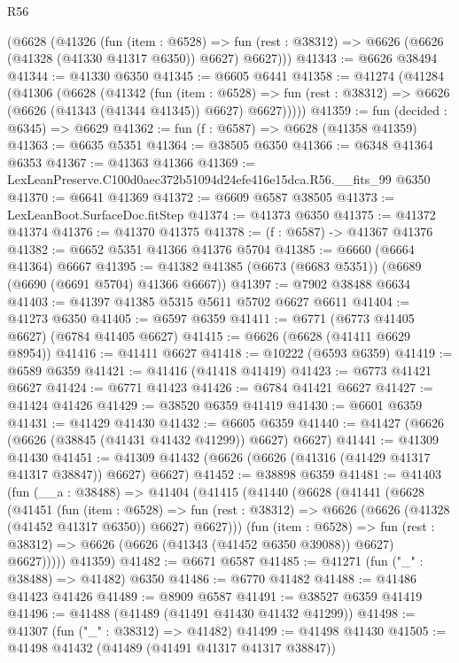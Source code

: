 \begin{lexlean}{R56}
\begin{coremodule}
    (@6628
      (@41326
        (fun (item : @6528) =>
        fun (rest : @38312) => @6626 (@6626 (@41328 (@41330 @41317 @6350)) @6627) @6627)))
@41343 := @6626 @38494
@41344 := @41330 @6350
@41345 := @6605 @6441
@41358 := @41274
    (@41284
      (@41306
        (@6628
          (@41342
            (fun (item : @6528) =>
            fun (rest : @38312) => @6626 (@6626 (@41343 (@41344 @41345)) @6627) @6627)))))
@41359 := fun (decided : @6345) => @6629
@41362 := fun (f : @6587) => @6628 (@41358 @41359)
@41363 := @6635 @5351
@41364 := @38505 @6350
@41366 := @6348 @41364 @6353
@41367 := @41363 @41366
@41369 := LexLeanPreserve.C100d0aec372b51094d24efe416e15dca.R56.__fits_99 @6350
@41370 := @6641 @41369
@41372 := @6609 @6587 @38505
@41373 := LexLeanBoot.SurfaceDoc.fitStep
@41374 := @41373 @6350
@41375 := @41372 @41374
@41376 := @41370 @41375
@41378 := (f : @6587) -> @41367 @41376
@41382 := @6652 @5351 @41366 @41376 @5704
@41385 := @6660 (@6664 @41364) @6667
@41395 := @41382 @41385 (@6673 (@6683 @5351)) (@6689 (@6690 (@6691 @5704) @41366 @6667))
@41397 := @7902 @38488 @6634
@41403 := @41397 @41385 @5315 @5611 @5702 @6627 @6611
@41404 := @41273 @6350
@41405 := @6597 @6359
@41411 := @6771 (@6773 @41405 @6627) (@6784 @41405 @6627)
@41415 := @6626 (@6628 (@41411 @6629 @8954))
@41416 := @41411 @6627
@41418 := @10222 (@6593 @6359)
@41419 := @6589 @6359
@41421 := @41416 (@41418 @41419)
@41423 := @6773 @41421 @6627
@41424 := @6771 @41423
@41426 := @6784 @41421 @6627
@41427 := @41424 @41426
@41429 := @38520 @6359 @41419
@41430 := @6601 @6359
@41431 := @41429 @41430
@41432 := @6605 @6359
@41440 := @41427 (@6626 (@6626 (@38845 (@41431 @41432 @41299)) @6627) @6627)
@41441 := @41309 @41430
@41451 := @41309 @41432 (@6626 (@6626 (@41316 (@41429 @41317 @41317 @38847)) @6627) @6627)
@41452 := @38898 @6359
@41481 := @41403
    (fun (__a : @38488) =>
    @41404
      (@41415
        (@41440
          (@6628
            (@41441
              (@6628
                (@41451
                  (fun (item : @6528) =>
                  fun (rest : @38312) => @6626 (@6626 (@41328 (@41452 @41317 @6350)) @6627) @6627)))
              (fun (item : @6528) =>
              fun (rest : @38312) => @6626 (@6626 (@41343 (@41452 @6350 @39088)) @6627) @6627)))))
      @41359)
@41482 := @6671 @6587
@41485 := @41271 (fun ("_" : @38488) => @41482) @6350
@41486 := @6770 @41482
@41488 := @41486 @41423 @41426
@41489 := @8909 @6587
@41491 := @38527 @6359 @41419
@41496 := @41488 (@41489 (@41491 @41430 @41432 @41299))
@41498 := @41307 (fun ("_" : @38312) => @41482)
@41499 := @41498 @41430
@41505 := @41498 @41432 (@41489 (@41491 @41317 @41317 @38847))

\end{coremodule}
\end{lexlean}
